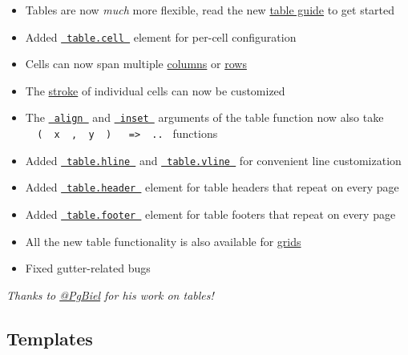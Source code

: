 \begin{itemize}
\tightlist
\item
  Tables are now \emph{much} more flexible, read the new
  \href{/docs/guides/table-guide/}{table guide} to get started
\item
  Added
  \href{/docs/reference/model/table/\#definitions-cell}{\texttt{\ table.cell\ }}
  element for per-cell configuration
\item
  Cells can now span multiple
  \href{/docs/reference/model/table/\#definitions-cell-colspan}{columns}
  or \href{/docs/reference/model/table/\#definitions-cell-rowspan}{rows}
\item
  The
  \href{/docs/reference/model/table/\#definitions-cell-stroke}{stroke}
  of individual cells can now be customized
\item
  The
  \href{/docs/reference/model/table/\#parameters-align}{\texttt{\ align\ }}
  and
  \href{/docs/reference/model/table/\#parameters-inset}{\texttt{\ inset\ }}
  arguments of the table function now also take
  \texttt{\ }{\texttt{\ (\ }}\texttt{\ x\ }{\texttt{\ ,\ }}\texttt{\ y\ }{\texttt{\ )\ }}\texttt{\ }{\texttt{\ =\textgreater{}\ }}\texttt{\ ..\ }
  functions
\item
  Added
  \href{/docs/reference/model/table/\#definitions-hline}{\texttt{\ table.hline\ }}
  and
  \href{/docs/reference/model/table/\#definitions-vline}{\texttt{\ table.vline\ }}
  for convenient line customization
\item
  Added
  \href{/docs/reference/model/table/\#definitions-header}{\texttt{\ table.header\ }}
  element for table headers that repeat on every page
\item
  Added
  \href{/docs/reference/model/table/\#definitions-footer}{\texttt{\ table.footer\ }}
  element for table footers that repeat on every page
\item
  All the new table functionality is also available for
  \href{/docs/reference/layout/grid/}{grids}
\item
  Fixed gutter-related bugs
\end{itemize}

\emph{Thanks to \href{https://github.com/PgBiel}{@PgBiel} for his work
on tables!}

\subsection{Templates}\label{templates}

